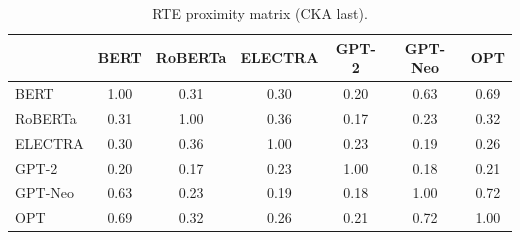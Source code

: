 \begin{table}[!ht]
\centering
\scriptsize
\setlength{\tabcolsep}{3pt}
\begin{tabular}{lcccccc}
\toprule
& \textbf{BERT} & \textbf{RoBERTa} & \textbf{ELECTRA} & \textbf{GPT-2} & \textbf{GPT-Neo} & \textbf{OPT} \\
\midrule
BERT & 1.00 & 0.31 & 0.30 & 0.20 & 0.63 & 0.69 \\
RoBERTa & 0.31 & 1.00 & 0.36 & 0.17 & 0.23 & 0.32 \\
ELECTRA & 0.30 & 0.36 & 1.00 & 0.23 & 0.19 & 0.26 \\
GPT-2 & 0.20 & 0.17 & 0.23 & 1.00 & 0.18 & 0.21 \\
GPT-Neo & 0.63 & 0.23 & 0.19 & 0.18 & 1.00 & 0.72 \\
OPT & 0.69 & 0.32 & 0.26 & 0.21 & 0.72 & 1.00 \\
\bottomrule
\end{tabular}
\caption{RTE proximity matrix (CKA last).}
\label{tab:proximity_rte}
\end{table}
